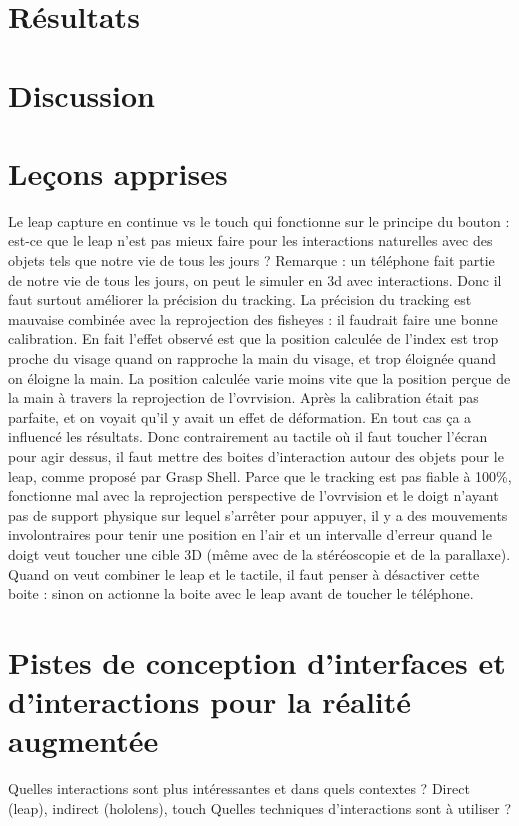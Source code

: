 \section{Résultats}


\section{Discussion}
\label{sec:discussion}

\section{Leçons apprises}
Le leap capture en continue vs le touch qui fonctionne sur le principe du bouton : est-ce que le leap n'est pas mieux faire pour les interactions naturelles avec des objets tels que notre vie de tous les jours ? Remarque : un téléphone fait partie de notre vie de tous les jours, on peut le simuler en 3d avec interactions. Donc il faut surtout améliorer la précision du tracking.
La précision du tracking est mauvaise combinée avec la reprojection des fisheyes : il faudrait faire une bonne calibration. En fait l'effet observé est que la position calculée de l'index est trop proche du visage quand on rapproche la main du visage, et trop éloignée quand on éloigne la main. La position calculée varie moins vite que la position perçue de la main à travers la reprojection de l'ovrvision. Après la calibration était pas parfaite, et on voyait qu'il y avait un effet de déformation. En tout cas ça a influencé les résultats.
Donc contrairement au tactile où il faut toucher l'écran pour agir dessus, il faut mettre des boites d'interaction autour des objets pour le leap, comme proposé par Grasp Shell. Parce que le tracking est pas fiable à 100\%, fonctionne mal avec la reprojection perspective de l'ovrvision et le doigt n'ayant pas de support physique sur lequel s'arrêter pour appuyer, il y a des mouvements involontraires pour tenir une position en l'air et un intervalle d'erreur quand le doigt veut toucher une cible 3D (même avec de la stéréoscopie et de la parallaxe).
Quand on veut combiner le leap et le tactile, il faut penser à désactiver cette boite : sinon on actionne la boite avec le leap avant de toucher le téléphone.


\section{Pistes de conception d'interfaces et d'interactions pour la réalité augmentée}
Quelles interactions sont plus intéressantes et dans quels contextes ? Direct (leap), indirect (hololens), touch
Quelles techniques d'interactions sont à utiliser ?
